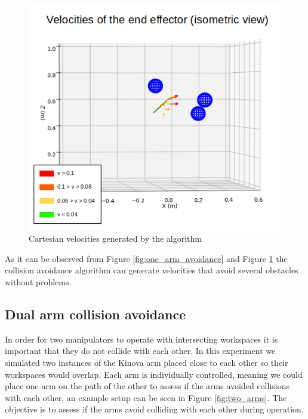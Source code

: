 \documentclass[a4paper, 10pt, conference]{ieeeconf}      %
\begin{document}
\begin{figure}[H]
	\includegraphics[scale=0.30]{images/one_arm_three_obstacles_side_vector.png}
	\caption{Cartesian velocities generated by the algorithm}
	\label{fig:one_arm_avoidance_vector}
\end{figure}

As it can be observed from Figure \ref{fig:one_arm_avoidance} and Figure \ref{fig:one_arm_avoidance_vector} the collision avoidance algorithm can generate velocities that avoid several obstacles without problems. 

\subsection{Dual arm collision avoidance} %

In order for two manipulators to operate with intersecting workspaces it is important that they do not collide with each other. In this experiment we simulated two instances of the Kinova arm placed close to each other so their workspaces would overlap. Each arm is individually controlled, meaning we could place one arm on the path of the other to assess if the arms avoided collisions with each other, an example setup can be seen in Figure \ref{fig:two_arms}. The objective is to assess if the arms avoid colliding with each other during operation.
\end{document}
